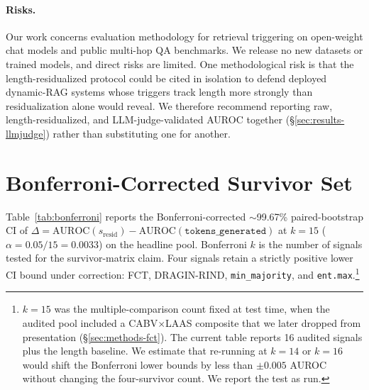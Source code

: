 \documentclass[11pt]{article}
\begin{document}
\paragraph{Risks.} Our work concerns evaluation methodology for retrieval triggering on open-weight chat models and public multi-hop QA benchmarks. We release no new datasets or trained models, and direct risks are limited. One methodological risk is that the length-residualized protocol could be cited in isolation to defend deployed dynamic-RAG systems whose triggers track length more strongly than residualization alone would reveal. We therefore recommend reporting raw, length-residualized, and LLM-judge-validated AUROC together (\S\ref{sec:results-llmjudge}) rather than substituting one for another.



\appendix

\section{Bonferroni-Corrected Survivor Set}
\label{sec:appendix-bonferroni}

Table~\ref{tab:bonferroni} reports the Bonferroni-corrected $\sim$99.67\% paired-bootstrap CI of $\Delta = \mathrm{AUROC}(s_{\text{resid}}) - \mathrm{AUROC}(\texttt{tokens\_generated})$ at $k{=}15$ ($\alpha = 0.05/15 = 0.0033$) on the headline pool. Bonferroni $k$ is the number of signals tested for the survivor-matrix claim. Four signals retain a strictly positive lower CI bound under correction: FCT, DRAGIN-RIND, \texttt{min\_majority}, and \texttt{ent.max}.\footnote{$k{=}15$ was the multiple-comparison count fixed at test time, when the audited pool included a CABV$\times$LAAS composite that we later dropped from presentation (\S\ref{sec:methods-fct}). The current table reports 16 audited signals plus the length baseline. We estimate that re-running at $k{=}14$ or $k{=}16$ would shift the Bonferroni lower bounds by less than $\pm 0.005$ AUROC without changing the four-survivor count. We report the test as run.}
\end{document}
